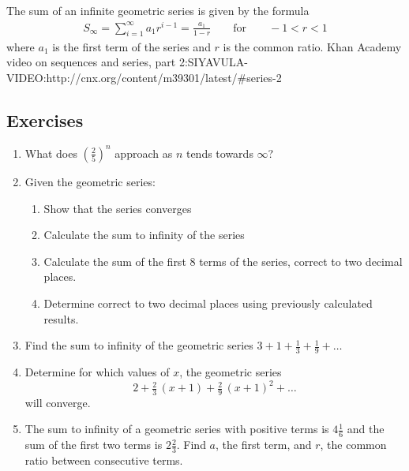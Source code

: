 The sum of an infinite geometric series is given by the formula
\begin{eqnarray}
\label{eq:mp:se:ig:4}
\boxed{S_\infty = \sum_{i=1}^\infty a_1r^{i-1} = \frac {a_1}{1-r} \qquad \mathrm{ for } \qquad -1<r<1 }
\end{eqnarray}
where $a_1$ is the first term of the series and $r$ is the common ratio.
Khan Academy video on sequences and series, part 2:SIYAVULA-VIDEO:http://cnx.org/content/m39301/latest/#series-2

\subsection{Exercises}
\begin{enumerate}
\item What does $(\tfrac{2}{5})^n$ approach as $n$ tends towards $\infty$?
\item{Given the geometric series:
\begin{enumerate}
\item Show that the series converges
\item Calculate the sum to infinity of the series
\item Calculate the sum of the first 8 terms of the series, correct to two decimal places.
\item Determine
correct to two decimal places using previously calculated results.
\end{enumerate}}
\item Find the sum to infinity of the geometric series $3 + 1 + \tfrac{1}{3} + \tfrac{1}{9} + \ldots$
\item Determine for which values of $x$, the geometric series $$2 + \tfrac{2}{3} \, (x+1) +\tfrac{2}{9} \, (x+1)^2 + \ldots$$ will converge.
\item The sum to infinity of a geometric series with positive terms is $4\tfrac{1}{6}$ and the sum of the first two terms is $2\tfrac{2}{3}$. Find $a$, the first term, and $r$, the common ratio between consecutive terms.
\end{enumerate}



